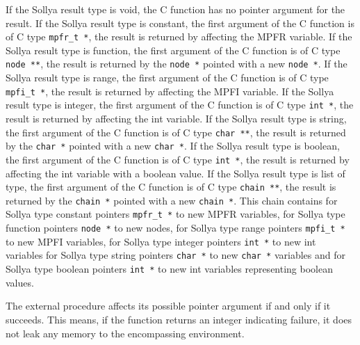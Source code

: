 \begin{itemize}
   If the Sollya result type is void, the C function has no pointer
   argument for the result.  If the Sollya result type is constant, the
   first argument of the C function is of C type \texttt{mpfr\_t *}, the result is
   returned by affecting the MPFR variable.  If the Sollya result type
   is function, the first argument of the C function is of C type \texttt{node **},
   the result is returned by the \texttt{node *} pointed with a new \texttt{node *}.
   If the Sollya result type is range, the first argument of the C
   function is of C type \texttt{mpfi\_t *}, the result is returned by affecting
   the MPFI variable.  If the Sollya result type is integer, the first
   argument of the C function is of C type \texttt{int *}, the result is returned
   by affecting the int variable.  If the Sollya result type is string,
   the first argument of the C function is of C type \texttt{char **}, the result
   is returned by the \texttt{char *} pointed with a new \texttt{char *}.  If the Sollya
   result type is boolean, the first argument of the C function is of C
   type \texttt{int *}, the result is returned by affecting the int variable with
   a boolean value.  If the Sollya result type is list of type, the
   first argument of the C function is of C type \texttt{chain **}, the result is
   returned by the \texttt{chain *} pointed with a new \texttt{chain *}.  This chain
   contains for Sollya type constant pointers \texttt{mpfr\_t *} to new MPFR
   variables, for Sollya type function pointers \texttt{node *} to new nodes, for
   Sollya type range pointers \texttt{mpfi\_t *}  to new MPFI variables, for
   Sollya type integer pointers \texttt{int *} to new int variables for Sollya
   type string pointers \texttt{char *} to new \texttt{char *} variables and for Sollya
   type boolean pointers \texttt{int *} to new int variables representing boolean
   values.
    	       
   The external procedure affects its possible pointer argument if and
   only if it succeeds.  This means, if the function returns an integer
   indicating failure, it does not leak any memory to the encompassing
   environment.
    

\end{itemize}
